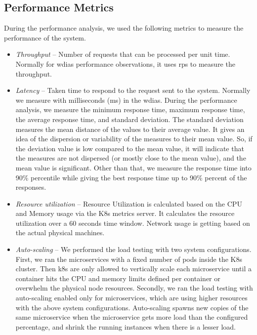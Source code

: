 \subsection{Performance Metrics}
\label{subse:test_plan_metrics}

During the performance analysis, we used the following metrics to measure the performance of the system.
\begin{itemize}
    \item \emph{Throughput} -- Number of requests that can be processed per unit time. 
    Normally for \acrshort{wdias} performance observations, it uses \acrfull{rps} to measure the throughput.
    \item \emph{Latency} -- Taken time to respond to the request sent to the system. 
    Normally we measure with milliseconds (ms) in the \acrshort{wdias}. During the performance analysis, we measure the minimum response time, maximum response time, the average response time, and standard deviation. The standard deviation measures the mean distance of the values to their average value. It gives an idea of the dispersion or variability of the measures to their mean value. So, if the deviation value is low compared to the mean value, it will indicate that the measures are not dispersed (or mostly close to the mean value), and the mean value is significant. Other than that, we measure the response time into 90\% percentile while giving the best response time up to 90\% percent of the responses.
    \item \emph{Resource utilization} -- Resource Utilization is calculated based on the CPU and Memory usage via the K8s metrics server. It calculates the resource utilization over a 60 seconds time window. Network usage is getting based on the actual physical machines.
    \item \emph{Auto-scaling} -- We performed the load testing with two system configurations. First, we ran the microservices with a fixed number of pods inside the K8s cluster. Then k8s are only allowed to vertically scale each microservice until a container hits the CPU and memory limits defined per container or overwhelm the physical node resources. Secondly, we ran the load testing with auto-scaling enabled only for microservices, which are using higher resources with the above system configurations. Auto-scaling spawns new copies of the same microservice when the microservice gets more load than the configured percentage, and shrink the running instances when there is a lesser load.
\end{itemize}
